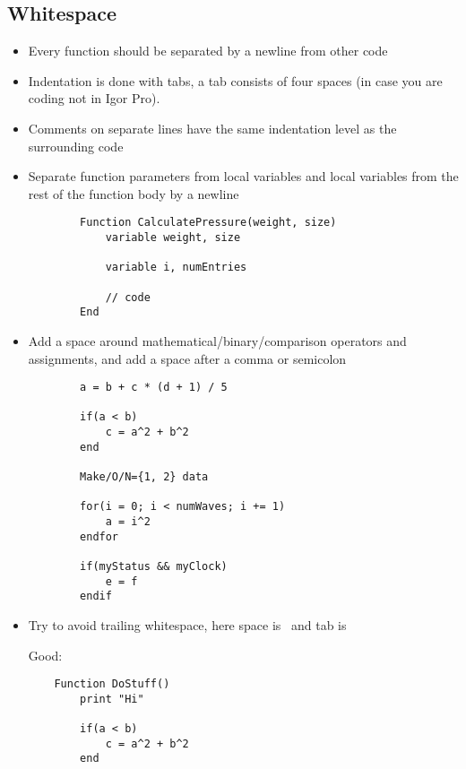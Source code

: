 \documentclass{scrartcl}
\begin{document}
\subsection*{Whitespace}
%
\begin{itemize}
	\item Every function should be separated by a newline from other code
%	
	\item Indentation is done with tabs, a tab consists of four spaces (in case you are coding not in Igor Pro).
%	
	\item Comments on separate lines have the same indentation level as the surrounding code
%	
	\item Separate function parameters from local variables and local variables from the rest of the function body by a newline
	\begin{verbatim}
		Function CalculatePressure(weight, size)
			variable weight, size
		
			variable i, numEntries
			
			// code
		End
	\end{verbatim}
%	
	\item Add a space around mathematical/binary/comparison operators and assignments, and add a space after a comma or semicolon
	\begin{verbatim}
		a = b + c * (d + 1) / 5
	
		if(a < b)
			c = a^2 + b^2
		end
	
		Make/O/N={1, 2} data
		
		for(i = 0; i < numWaves; i += 1)
			a = i^2
		endfor
		
		if(myStatus && myClock)
			e = f
		endif
	\end{verbatim}
%	
	\item Try to avoid trailing whitespace, here space is \FancyVerbSpace\normalfont\ and tab is \FancyVerbTab\par
	Good:\par
	\begin{verbatim}
	Function DoStuff()
		print "Hi"
		
		if(a < b)
			c = a^2 + b^2
		end
		

\end{verbatim}
\end{itemize}
\end{document}

